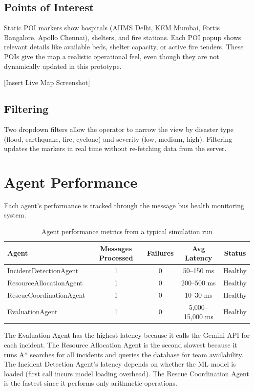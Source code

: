 \subsection{Points of Interest}

Static POI markers show hospitals (AIIMS Delhi, KEM Mumbai, Fortis Bangalore, Apollo Chennai), shelters, and fire stations. Each POI popup shows relevant details like available beds, shelter capacity, or active fire tenders. These POIs give the map a realistic operational feel, even though they are not dynamically updated in this prototype.

[Insert Live Map Screenshot]

\subsection{Filtering}

Two dropdown filters allow the operator to narrow the view by disaster type (flood, earthquake, fire, cyclone) and severity (low, medium, high). Filtering updates the markers in real time without re-fetching data from the server.

\section{Agent Performance}
\label{sec:agent_performance}

Each agent's performance is tracked through the message bus health monitoring system.

\begin{table}[H]
\centering
\caption{Agent performance metrics from a typical simulation run}
\label{tab:agent_performance}
\begin{tabular}{|l|c|c|c|c|}
\hline
\textbf{Agent} & \textbf{Messages Processed} & \textbf{Failures} & \textbf{Avg Latency} & \textbf{Status} \\
\hline
IncidentDetectionAgent & 1 & 0 & 50--150 ms & Healthy \\
\hline
ResourceAllocationAgent & 1 & 0 & 200--500 ms & Healthy \\
\hline
RescueCoordinationAgent & 1 & 0 & 10--30 ms & Healthy \\
\hline
EvaluationAgent & 1 & 0 & 5,000--15,000 ms & Healthy \\
\hline
\end{tabular}
\end{table}

The Evaluation Agent has the highest latency because it calls the Gemini API for each incident. The Resource Allocation Agent is the second slowest because it runs A* searches for all incidents and queries the database for team availability. The Incident Detection Agent's latency depends on whether the ML model is loaded (first call incurs model loading overhead). The Rescue Coordination Agent is the fastest since it performs only arithmetic operations.

